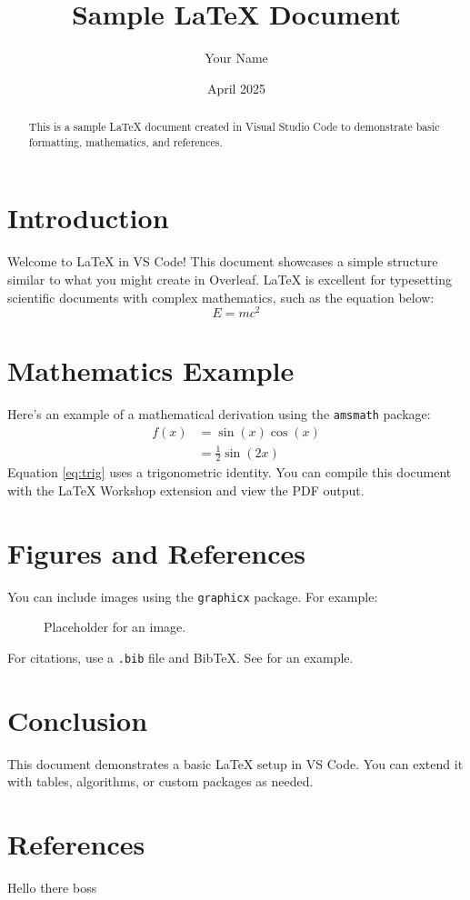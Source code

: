 \documentclass[12pt]{article}
\title{Sample LaTeX Document}
\author{Your Name}
\date{April 2025}
\begin{document}
\maketitle

\begin{abstract}
This is a sample LaTeX document created in Visual Studio Code to demonstrate basic formatting, mathematics, and references.
\end{abstract} 

\section{Introduction}
Welcome to LaTeX in VS Code! This document showcases a simple structure similar to what you might create in Overleaf. LaTeX is excellent for typesetting scientific documents with complex mathematics, such as the equation below:
\begin{equation} 
E = mc^2
\end{equation}

\section{Mathematics Example}
Here’s an example of a mathematical derivation using the \texttt{amsmath} package:
\begin{align}
f(x) &= \sin(x) \cos(x) \\
     &= \frac{1}{2} \sin(2x) \label{eq:trig}
\end{align}
Equation \eqref{eq:trig} uses a trigonometric identity. You can compile this document with the LaTeX Workshop extension and view the PDF output.

\section{Figures and References}
You can include images using the \texttt{graphicx} package. For example:
\begin{figure}[h]
    \centering
    \caption{Placeholder for an image.}
    \label{fig:example}
\end{figure}

For citations, use a \texttt{.bib} file and BibTeX. See \cite{knuth1997art} for an example.

\section{Conclusion}
This document demonstrates a basic LaTeX setup in VS Code. You can extend it with tables, algorithms, or custom packages as needed.





\section{References}

Hello there boss
\end{document}
